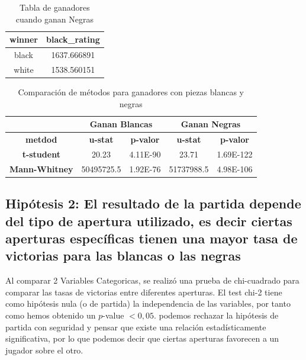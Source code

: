 \documentclass[a4paper, 12pt]{article}
\begin{document}
\begin{table}[h!]
    \centering
    \begin{tabular}{|c|c|}
        \hline
        \textbf{winner} & \textbf{black\_rating} \\ \hline
        black & 1637.666891 \\ \hline
        white & 1538.560151 \\ \hline
    \end{tabular}
    \caption{Tabla de ganadores cuando ganan Negras}
    \label{table:black_rating}
\end{table}


\begin{table}[h!]
    \centering
    \begin{tabular}{|c|c|c|c|c|}
        \hline
        & \multicolumn{2}{|c|}{\textbf{Ganan Blancas}} & \multicolumn{2}{|c|}{\textbf{Ganan Negras}} \\ \hline
        \textbf{metdod} & \textbf{u-stat} & \textbf{p-valor} & \textbf{u-stat} & \textbf{p-valor} \\ \hline
        \textbf{t-student} & 20.23 & 4.11E-90 & 23.71 & 1.69E-122 \\ \hline
        \textbf{Mann-Whitney} & 50495725.5 & 1.92E-76 & 51737988.5 & 4.98E-106 \\ \hline
    \end{tabular}
    \caption{Comparación de métodos para ganadores con piezas blancas y negras}
    \label{table:comparison}
\end{table}

\newpage

\subsection{Hipótesis 2: El resultado de la partida depende del tipo de apertura utilizado, es decir ciertas aperturas específicas tienen una mayor tasa de victorias para las blancas o las negras}

Al comparar 2 Variables Categoricas, se realizó una prueba de chi-cuadrado para comparar las tasas de victorias entre diferentes aperturas. El test chi-2 tiene como hipótesis nula (o de partida) 
la independencia de las variables, por tanto como hemos obtenido un $p$-value $< 0{,}05$. podemos rechazar la hipótesis de partida con seguridad y pensar que existe una relación estadísticamente significativa, 
por lo que podemos decir que ciertas aperturas favorecen a un jugador sobre el otro.
\end{document}
